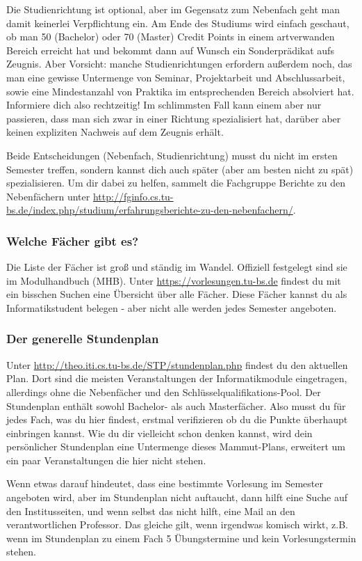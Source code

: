 	Die Studienrichtung ist  optional, aber im Gegensatz zum Nebenfach geht man damit keinerlei Verpflichtung ein. Am Ende des Studiums wird einfach geschaut, ob man 50 (Bachelor) oder 70 (Master) Credit Points in einem artverwanden Bereich erreicht hat und bekommt dann auf Wunsch ein Sonderprädikat aufs Zeugnis. Aber Vorsicht: manche Studienrichtungen erfordern außerdem noch, das man eine gewisse Untermenge von Seminar, Projektarbeit und Abschlussarbeit, sowie eine Mindestanzahl von Praktika im entsprechenden Bereich absolviert hat. Informiere dich also rechtzeitig! Im schlimmsten Fall kann einem aber nur passieren, dass man sich zwar in einer Richtung spezialisiert hat, darüber aber keinen expliziten Nachweis auf dem Zeugnis erhält.

	Beide Entscheidungen (Nebenfach, Studienrichtung) musst du nicht im ersten Semester treffen, sondern kannst dich auch später (aber am besten nicht zu spät) spezialisieren. Um dir dabei zu helfen, sammelt die Fachgruppe Berichte zu den Nebenfächern unter \url{http://fginfo.cs.tu-bs.de/index.php/studium/erfahrungsberichte-zu-den-nebenfachern/}. 

\subsubsection{Welche Fächer gibt es?}
	Die Liste der Fächer ist groß und ständig im Wandel. Offiziell festgelegt sind sie im Modulhandbuch (MHB). Unter \url{https://vorlesungen.tu-bs.de} findest du mit ein bisschen Suchen eine Übersicht über alle Fächer. Diese Fächer kannst du als Informatikstudent belegen - aber nicht alle werden jedes Semester angeboten.

\subsubsection{Der generelle Stundenplan}
	Unter \url{http://theo.iti.cs.tu-bs.de/STP/stundenplan.php} findest du den aktuellen Plan. Dort sind die meisten Veranstaltungen der Informatikmodule eingetragen, allerdings ohne die Nebenfächer und den Schlüsselqualifikations-Pool. Der Stundenplan enthält sowohl Bachelor- als auch Masterfächer. Also musst du für jedes Fach, was du hier findest, erstmal verifizieren ob du die Punkte überhaupt einbringen kannst. Wie du dir vielleicht schon denken kannst, wird dein persönlicher Stundenplan eine Untermenge dieses Mammut-Plans, erweitert um ein paar Veranstaltungen die hier nicht stehen.

	Wenn etwas darauf hindeutet, dass eine bestimmte Vorlesung im Semester angeboten wird, aber im Stundenplan nicht auftaucht, dann hilft eine Suche auf den Institusseiten, und wenn selbst das nicht hilft, eine Mail an den verantwortlichen Professor. Das gleiche gilt, wenn irgendwas komisch wirkt, z.B. wenn im Stundenplan zu einem Fach 5 Übungstermine und kein Vorlesungstermin stehen.

